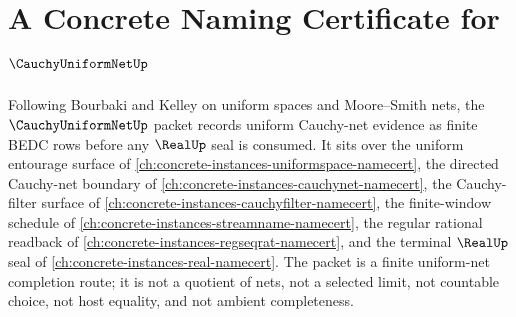 \chapter{A Concrete Naming Certificate for $\CauchyUniformNetUp$}
\label{ch:concrete-instances-cauchy-uniform-net-namecert}

Following Bourbaki and Kelley on uniform spaces and Moore--Smith nets, the $\CauchyUniformNetUp$ packet records uniform Cauchy-net evidence as finite BEDC rows before any $\RealUp$ seal is consumed. It sits over the uniform entourage surface of \autoref{ch:concrete-instances-uniformspace-namecert}, the directed Cauchy-net boundary of \autoref{ch:concrete-instances-cauchynet-namecert}, the Cauchy-filter surface of \autoref{ch:concrete-instances-cauchyfilter-namecert}, the finite-window schedule of \autoref{ch:concrete-instances-streamname-namecert}, the regular rational readback of \autoref{ch:concrete-instances-regseqrat-namecert}, and the terminal $\RealUp$ seal of \autoref{ch:concrete-instances-real-namecert}. The packet is a finite uniform-net completion route; it is not a quotient of nets, not a selected limit, not countable choice, not host equality, and not ambient completeness.

